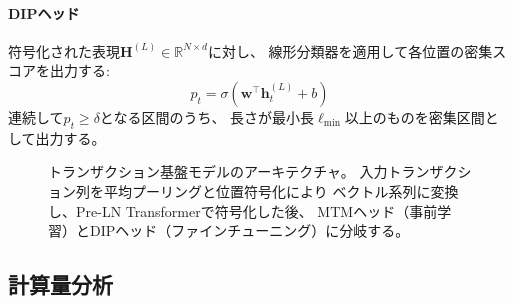 \documentclass[sigconf,nonacm]{acmart}
\begin{document}
\paragraph{DIPヘッド}
符号化された表現$\mathbf{H}^{(L)} \in \mathbb{R}^{N \times d}$に対し、
線形分類器を適用して各位置の密集スコアを出力する:
\begin{equation}
    p_t = \sigma(\mathbf{w}^\top \mathbf{h}_t^{(L)} + b)
\end{equation}
連続して$p_t \geq \delta$となる区間のうち、
長さが最小長$\ell_{\min}$以上のものを密集区間として出力する。

\begin{figure}[t]
\centering
{}
\caption{トランザクション基盤モデルのアーキテクチャ。
入力トランザクション列を平均プーリングと位置符号化により
ベクトル系列に変換し、Pre-LN Transformerで符号化した後、
MTMヘッド（事前学習）とDIPヘッド（ファインチューニング）に分岐する。}
\label{fig:architecture}
\end{figure}

\subsection{計算量分析}
\end{document}
